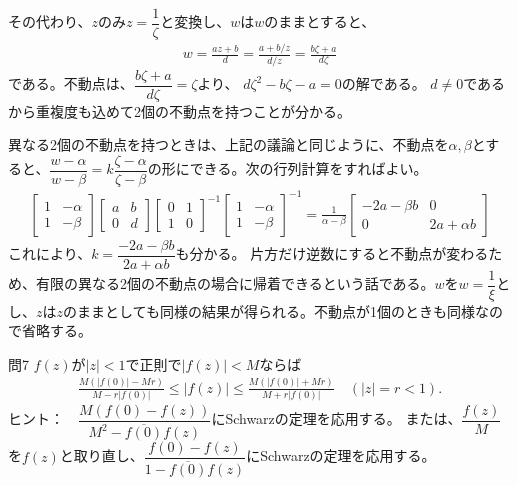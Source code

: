 その代わり、$z$のみ$z=\dfrac{1}{\zeta}$と変換し、$w$は$w$のままとすると、
\begin{align*}
    w=\frac{az+b}{d}=\frac{a+b/z}{d/z}=\frac{b\zeta+a}{d\zeta}
\end{align*}
である。不動点は、$\dfrac{b\zeta+a}{d\zeta}=\zeta$より、
$d\zeta^2-b\zeta-a=0$の解である。
$d\neq0$であるから重複度も込めて2個の不動点を持つことが分かる。

異なる2個の不動点を持つときは、上記の議論と同じように、不動点を$\alpha,\beta$とすると、$\dfrac{w-\alpha}{w-\beta}=k\dfrac{\zeta-\alpha}{\zeta-\beta}$の形にできる。次の行列計算をすればよい。
\begin{align*}
    \begin{bmatrix}
        1&-\alpha\\1&-\beta
    \end{bmatrix}
    \begin{bmatrix}
        a&b\\0&d
    \end{bmatrix}
    \begin{bmatrix}
        0&1\\1&0
    \end{bmatrix}^{-1}
    \begin{bmatrix}
        1&-\alpha\\1&-\beta
    \end{bmatrix}^{-1}
    =\frac{1}{\alpha-\beta}
    \begin{bmatrix}
        -2a-\beta b&0\\0&2a+\alpha b
    \end{bmatrix}
\end{align*}
これにより、$k=\dfrac{-2a-\beta b}{2a+\alpha b}$も分かる。
片方だけ逆数にすると不動点が変わるため、有限の異なる2個の不動点の場合に帰着できるという話である。$w$を$w=\dfrac{1}{\xi}$とし、$z$は$z$のままとしても同様の結果が得られる。不動点が1個のときも同様なので省略する。

\newpage
\begin{mysimplebox}{問7}
    $f(z)$が$|z|<1$で正則で$|f(z)|<M$ならば
    \begin{align*}
        \frac{M(|f(0)|-Mr)}{M-r|f(0)|}
        \le|f(z)|
        \le\frac{M(|f(0)|+Mr)}{M+r|f(0)|}
        \quad(|z|=r<1).
    \end{align*}
    ヒント：　$\dfrac{M(f(0)-f(z))}{M^2-\overline{f(0)}f(z)}$にSchwarzの定理を応用する。
    または、$\dfrac{f(z)}{M}$を$f(z)$と取り直し、$\dfrac{f(0)-f(z)}{1-\overline{f(0)}f(z)}$にSchwarzの定理を応用する。
\end{mysimplebox}
